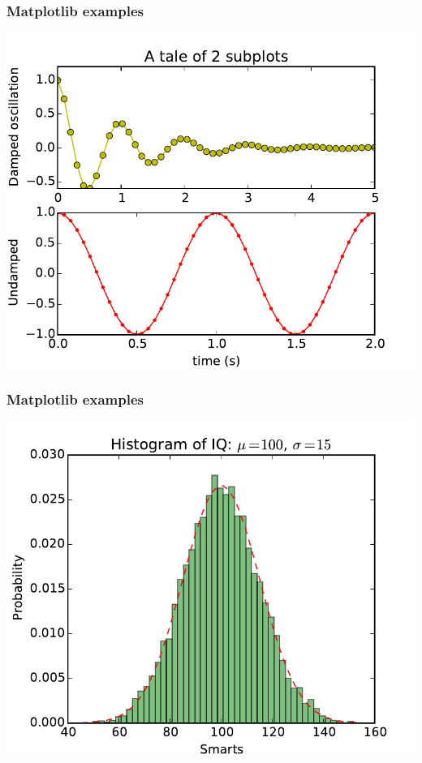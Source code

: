 \documentclass[14pt]{beamer}
\begin{document}
\begin{frame}
\frametitle{Matplotlib examples}
\includegraphics[width=\textwidth]{subplot_demo.pdf}
\end{frame}

\begin{frame}
\frametitle{Matplotlib examples}
\includegraphics[width=\textwidth]{histogram_demo_features.pdf}
\end{frame}
\end{document}
